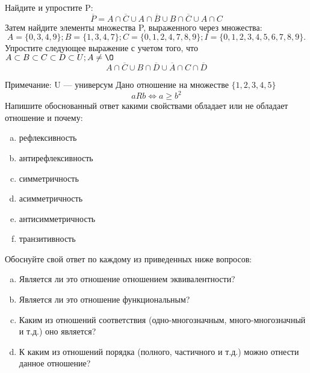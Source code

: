 \documentclass[10pt]{exam}
\begin{document}
\begin{questions}
\question
Найдите и упростите P:
\begin{equation*}
\overline{P} = A \cap \overline{C} \cup A \cap \overline{B} \cup B \cap \overline{C} \cup A \cap C
\end{equation*}
Затем найдите элементы множества P, выраженного через множества:
\begin{equation*}
A = \{0, 3, 4, 9\}; 
B = \{1, 3, 4, 7\};
C = \{0, 1, 2, 4, 7, 8, 9\};
I = \{0, 1, 2, 3, 4, 5, 6, 7, 8, 9\}.
\end{equation*}\question
Упростите следующее выражение с учетом того, что $A\subset B \subset C \subset D \subset U; A \neq \O$
\begin{equation*}
A \cap  \overline{C} \cup B \cap \overline{D} \cup  \overline{A} \cap C \cap  \overline{D}
\end{equation*}

Примечание: U — универсум\question
Дано отношение на множестве $\{1, 2, 3, 4, 5\}$ 
\begin{equation*}
aRb \iff a \geq b^2
\end{equation*}
Напишите обоснованный ответ какими свойствами обладает или не обладает отношение и почему:   
\begin{enumerate} [a)]\setcounter{enumi}{0}
\item рефлексивность
\item антирефлексивность
\item симметричность
\item асимметричность
\item антисимметричность
\item транзитивность
\end{enumerate}

Обоснуйте свой ответ по каждому из приведенных ниже вопросов:
\begin{enumerate} [a)]\setcounter{enumi}{0}
    \item Является ли это отношение отношением эквивалентности?
    \item Является ли это отношение функциональным?
    \item Каким из отношений соответствия (одно-многозначным, много-многозначный и т.д.) оно является?
    \item К каким из отношений порядка (полного, частичного и т.д.) можно отнести данное отношение?
\end{enumerate}



\end{questions}
\end{document}
